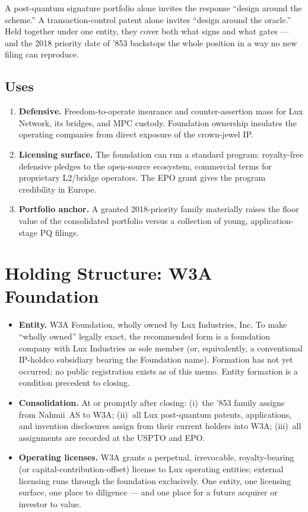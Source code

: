 \documentclass[11pt,a4paper]{article}
\begin{document}
A post-quantum signature portfolio alone invites the response
``design around the scheme.'' A transaction-control patent alone
invites ``design around the oracle.'' Held together under one entity,
they cover both what signs and what gates --- and the 2018 priority
date of '853 backstops the whole position in a way no new filing can
reproduce.

\subsection{Uses}

\begin{enumerate}[leftmargin=1.6em]
  \item \textbf{Defensive.} Freedom-to-operate insurance and
  counter-assertion mass for Lux Network, its bridges, and MPC custody.
  Foundation ownership insulates the operating companies from direct
  exposure of the crown-jewel IP.
  \item \textbf{Licensing surface.} The foundation can run a standard
  program: royalty-free defensive pledges to the open-source ecosystem,
  commercial terms for proprietary L2/bridge operators. The EPO grant
  gives the program credibility in Europe.
  \item \textbf{Portfolio anchor.} A granted 2018-priority family
  materially raises the floor value of the consolidated portfolio
  versus a collection of young, application-stage PQ filings.
\end{enumerate}

\section{Holding Structure: W3A Foundation}

\begin{itemize}[leftmargin=1.4em]
  \item \textbf{Entity.} W3A Foundation, wholly owned by Lux
  Industries, Inc. To make ``wholly owned'' legally exact, the
  recommended form is a foundation company with Lux Industries as sole
  member (or, equivalently, a conventional IP-holdco subsidiary bearing
  the Foundation name). Formation has not yet occurred; no public
  registration exists as of this memo. Entity formation is a
  condition precedent to closing.
  \item \textbf{Consolidation.} At or promptly after closing:
  (i)~the '853 family assigns from Nahmii~AS to W3A;
  (ii)~all Lux post-quantum patents, applications, and invention
  disclosures assign from their current holders into W3A;
  (iii)~all assignments are recorded at the USPTO and EPO.
  \item \textbf{Operating licenses.} W3A grants a perpetual,
  irrevocable, royalty-bearing (or capital-contribution-offset)
  license to Lux operating entities; external licensing runs through
  the foundation exclusively. One entity, one licensing surface, one
  place to diligence --- and one place for a future acquirer or
  investor to value.
\end{itemize}
\end{document}
